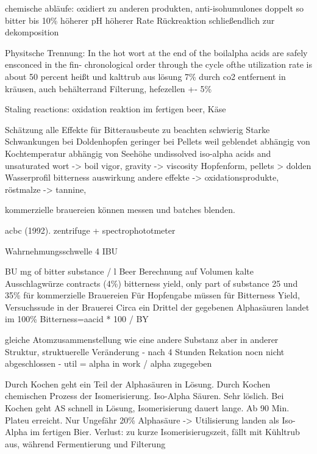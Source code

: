\documentclass[a4paper,parskip=half]{scrartcl}
\begin{document}
chemische abläufe: oxidiert zu anderen produkten, 
anti-isohumulones doppelt so bitter bis 10\%
höherer pH höherer Rate
Rückreaktion schließendlich zur dekomposition

Physitsche Trennung: In the hot wort at the end of the boilalpha acids are safely ensconced in the fin-
chronological order through the cycle ofthe utilization rate is about 50 percent
heißt und kalttrub aus lösung 7\%
durch co2 entfernent in kräusen, auch behälterrand
Filterung, hefezellen +- 5\%

Staling reactions: oxidation reaktion im fertigen beer, Käse

\parencite[58]{Hall1997}
Schätzung alle Effekte für Bitterausbeute zu beachten schwierig
Starke Schwankungen bei Doldenhopfen
geringer bei Pellets weil geblendet
abhängig von Kochtemperatur abhängig von Seehöhe
undissolved iso-alpha acids and unsaturated wort -> boil vigor, gravity -> viscosity
Hopfenform, pellets > dolden
Wasserprofil bitterness auswirkung
andere effekte -> oxidationsprodukte, röstmalze -> tannine, 

kommerzielle brauereien können messen und batches blenden.

acbc (1992). zentrifuge + spectrophototmeter

Wahrnehmungsschwelle 4 IBU





\parencite[320]{Kunze2004}
BU mg of bitter substance / l Beer
Berechnung auf Volumen kalte Ausschlagwürze contracts (4\%)
bitterness yield, only part of substance
25 und 35\% für kommerzielle Brauereien
Für Hopfengabe müssen für Bitterness Yield, Versuchssude in der Brauerei
Circa ein Drittel der gegebenen Alphasäuren landet im 
100\% Bitterness=aacid * 100 / BY

\parencite[51]{Davidson1997} gleiche Atomzusammenstellung wie
eine andere Substanz aber in anderer Struktur, struktuerelle
Veränderung
- nach 4 Stunden Rekation nocn nicht abgeschlossen
- util = alpha in work / alpha zugegeben

\parencite[12]{Garetz1994}
Durch Kochen geht ein Teil der Alphasäuren in Lösung. Durch Kochen
chemischen Prozess der Isomerisierung. Iso-Alpha Säuren. Sehr löslich.
Bei Kochen geht AS schnell in Lösung, Isomerisierung dauert lange.
Ab 90 Min. Plateu erreicht.
Nur Ungefähr 20\% Alphasäure -> Utilisierung landen als Iso-Alpha im
fertigen Bier.
Verlust: zu kurze Isomerisierugszeit, fällt mit Kühltrub aus,
während Fermentierung und Filterung
\end{document}
